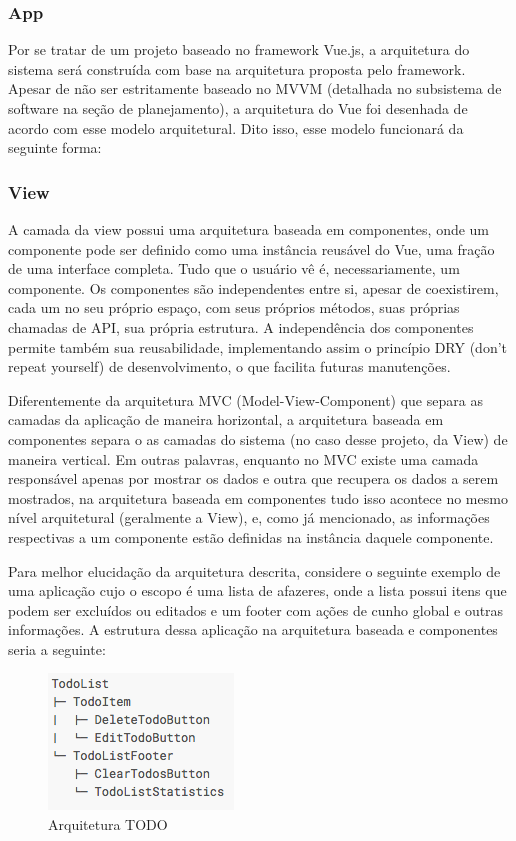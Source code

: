 \begin{apendicesenv}
\subsubsection{App}
Por se tratar de um projeto baseado no framework Vue.js, a arquitetura do sistema será construída com base na arquitetura proposta pelo framework. Apesar de não ser estritamente baseado no MVVM (detalhada no subsistema de software na seção de planejamento), a arquitetura do Vue foi desenhada de acordo com esse modelo arquitetural. Dito isso, esse modelo funcionará da seguinte forma:

\subsubsection{View}
A camada da view possui uma arquitetura baseada em componentes, onde um componente pode ser definido como uma instância reusável do Vue, uma fração de uma interface completa. Tudo que o usuário vê é, necessariamente, um componente. Os componentes são independentes entre si, apesar de coexistirem, cada um no seu próprio espaço, com seus próprios métodos, suas próprias chamadas de API, sua própria estrutura. A independência dos componentes permite também sua reusabilidade, implementando assim o princípio DRY (don't repeat yourself) de desenvolvimento, o que facilita futuras manutenções.

Diferentemente da arquitetura MVC (Model-View-Component) que separa as camadas da aplicação de maneira horizontal, a arquitetura baseada em componentes separa o as camadas do sistema (no caso desse projeto, da View) de maneira vertical. Em outras palavras, enquanto no MVC existe uma camada responsável apenas por mostrar os dados e outra que recupera os dados a serem mostrados, na arquitetura baseada em componentes tudo isso acontece no mesmo nível arquitetural (geralmente a View), e, como já mencionado, as informações respectivas a um componente estão definidas na instância daquele componente. 

Para melhor elucidação da arquitetura descrita, considere o seguinte exemplo de uma aplicação cujo o escopo é uma lista de afazeres, onde a lista possui itens que podem ser excluídos ou editados e um footer com ações de cunho global e outras informações. A estrutura dessa aplicação na arquitetura baseada e componentes seria a seguinte:

\begin{figure}[!ht]
	\centering
		\includegraphics[scale=0.6]{figuras/software/5-arquitetura-todo.png}
	\caption{Arquitetura TODO}
\end{figure}


\end{apendicesenv}
